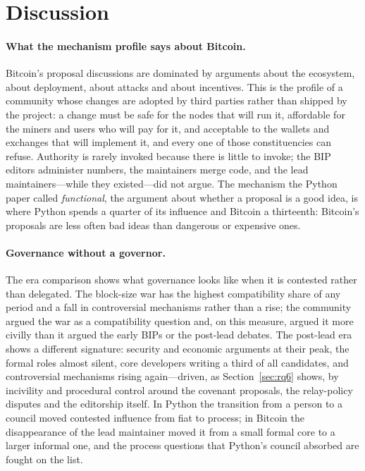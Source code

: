 \section{Discussion}

\paragraph{What the mechanism profile says about Bitcoin.} Bitcoin's proposal discussions are dominated by arguments about the ecosystem, about deployment, about attacks and about incentives. This is the profile of a community whose changes are adopted by third parties rather than shipped by the project: a change must be safe for the nodes that will run it, affordable for the miners and users who will pay for it, and acceptable to the wallets and exchanges that will implement it, and every one of those constituencies can refuse. Authority is rarely invoked because there is little to invoke; the BIP editors administer numbers, the maintainers merge code, and the lead maintainers---while they existed---did not argue. The mechanism the Python paper called \emph{functional}, the argument about whether a proposal is a good idea, is where Python spends a quarter of its influence and Bitcoin a thirteenth: Bitcoin's proposals are less often bad ideas than dangerous or expensive ones.

\paragraph{Governance without a governor.} The era comparison shows what governance looks like when it is contested rather than delegated. The block-size war has the highest compatibility share of any period and a fall in controversial mechanisms rather than a rise; the community argued the war as a compatibility question and, on this measure, argued it more civilly than it argued the early BIPs or the post-lead debates. The post-lead era shows a different signature: security and economic arguments at their peak, the formal roles almost silent, core developers writing a third of all candidates, and controversial mechanisms rising again---driven, as Section~\ref{sec:rq6} shows, by incivility and procedural control around the covenant proposals, the relay-policy disputes and the editorship itself. In Python the transition from a person to a council moved contested influence from fiat to process; in Bitcoin the disappearance of the lead maintainer moved it from a small formal core to a larger informal one, and the process questions that Python's council absorbed are fought on the list.

